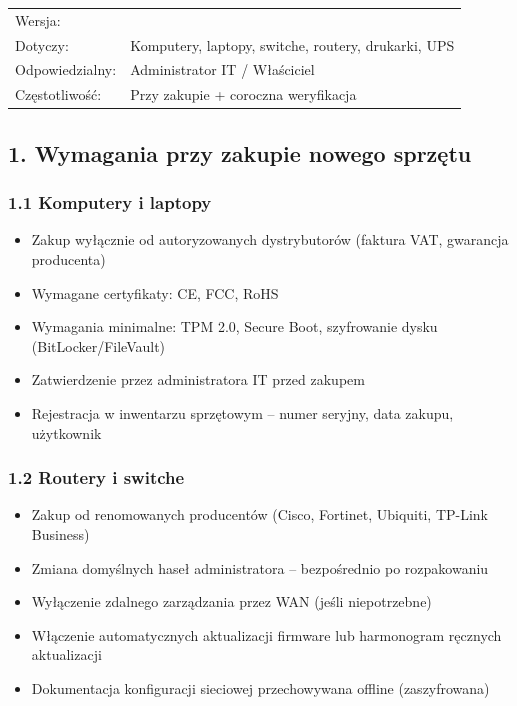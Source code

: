 \documentclass[12pt,a4paper]{article}
\providecommand{\tightlist}{\setlength{\itemsep}{0pt}\setlength{\parskip}{0pt}}
\begin{document}
\begin{longtable}[]{@{}>{\raggedright\arraybackslash}p{}>{\raggedright\arraybackslash}p{}@{}}
\toprule\noalign{}
\endhead
\bottomrule\noalign{}
\endlastfoot
Wersja: & 1.0 \\
Dotyczy: & Komputery, laptopy, switche, routery, drukarki, UPS \\
Odpowiedzialny: & Administrator IT / Właściciel \\
Częstotliwość: & Przy zakupie + coroczna weryfikacja \\
\end{longtable}

\subsection{1. Wymagania przy zakupie nowego
sprzętu}\label{wymagania-przy-zakupie-nowego-sprzux119tu}

\subsubsection{1.1 Komputery i laptopy}\label{komputery-i-laptopy}

\begin{itemize}
\tightlist
\item
  Zakup wyłącznie od autoryzowanych dystrybutorów (faktura VAT,
  gwarancja producenta)
\item
  Wymagane certyfikaty: CE, FCC, RoHS
\item
  Wymagania minimalne: TPM 2.0, Secure Boot, szyfrowanie dysku
  (BitLocker/FileVault)
\item
  Zatwierdzenie przez administratora IT przed zakupem
\item
  Rejestracja w inwentarzu sprzętowym -- numer seryjny, data zakupu,
  użytkownik
\end{itemize}

\subsubsection{1.2 Routery i switche}\label{routery-i-switche}

\begin{itemize}
\tightlist
\item
  Zakup od renomowanych producentów (Cisco, Fortinet, Ubiquiti, TP-Link
  Business)
\item
  Zmiana domyślnych haseł administratora -- bezpośrednio po rozpakowaniu
\item
  Wyłączenie zdalnego zarządzania przez WAN (jeśli niepotrzebne)
\item
  Włączenie automatycznych aktualizacji firmware lub harmonogram
  ręcznych aktualizacji
\item
  Dokumentacja konfiguracji sieciowej przechowywana offline
  (zaszyfrowana)
\end{itemize}
\end{document}
